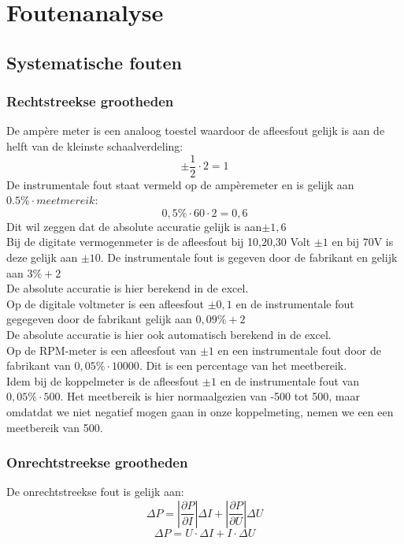 \section{Foutenanalyse}
\subsection{Systematische fouten}
\subsubsection{Rechtstreekse grootheden}
De amp\`ere meter is een analoog toestel waardoor de afleesfout gelijk is aan de helft van de kleinste schaalverdeling:
$$\pm\frac{1}{2}\cdot 2=1$$ De instrumentale fout staat vermeld op de amp\`eremeter en is gelijk aan $0.5\% \cdot meetmereik$:
$$0,5\% \cdot 60 \cdot 2 = 0,6$$ Dit wil zeggen dat de absolute accuratie gelijk is aan$\pm 1,6$\\


\noindent Bij de digitate vermogenmeter is de afleesfout bij 10,20,30 Volt 
$\pm 1$ en bij 70V is deze gelijk aan $\pm 10$.
De instrumentale fout is gegeven door de fabrikant en gelijk aan $3\% + 2$\\
De absolute accuratie is hier berekend in de excel.\\

\noindent Op de digitale voltmeter is een afleesfout $\pm 0,1$ en de instrumentale fout gegegeven door de 
fabrikant gelijk aan $0,09\% + 2$\\
De absolute accuratie is hier ook automatisch berekend in de excel.\\

\noindent Op de RPM-meter is een afleesfout van $\pm 1$ en een instrumentale fout door de fabrikant van 
$0,05\% \cdot10000$. Dit is een percentage van het meetbereik.\\

\noindent Idem bij de koppelmeter is de afleesfout $\pm 1$ en de instrumentale fout van $0,05\% \cdot 500$.
Het meetbereik is hier normaalgezien van -500 tot 500, maar omdatdat we niet negatief mogen gaan in onze 
koppelmeting, nemen we een een meetbereik van 500.\\

\subsubsection{Onrechtstreekse grootheden}
De onrechtstreekse fout is gelijk aan:
\begin{equation}
    \Delta P = \left| \frac{\partial P}{\partial I}\right| \Delta I + \left| \frac{\partial P}{\partial U}\right| \Delta U
\end{equation}
\begin{equation*}
    \Delta P = U \cdot \Delta  I + I \cdot \Delta U
\end{equation*}
    





